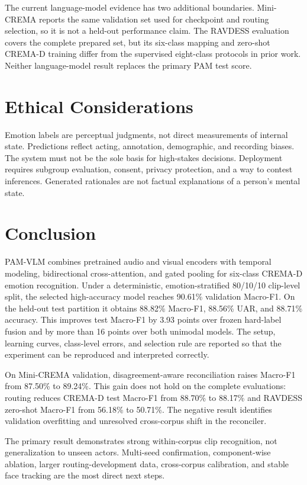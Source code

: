 \documentclass[conference]{IEEEtran}
\begin{document}
The current language-model evidence has two additional boundaries.
Mini-CREMA reports the same validation set used for checkpoint and routing
selection, so it is not a held-out performance claim. The RAVDESS evaluation
covers the complete prepared set, but its six-class mapping and zero-shot
CREMA-D training differ from the supervised eight-class protocols in prior
work. Neither language-model result replaces the primary PAM test score.

\section{Ethical Considerations}
\label{sec:ethics}

Emotion labels are perceptual judgments, not direct measurements of internal
state. Predictions reflect acting, annotation, demographic, and recording
biases. The system must not be the sole basis for high-stakes decisions.
Deployment requires subgroup evaluation, consent, privacy protection, and a
way to contest inferences. Generated rationales are not factual explanations
of a person's mental state.

\section{Conclusion}
\label{sec:conclusion}

PAM-VLM combines pretrained audio and visual encoders with temporal modeling,
bidirectional cross-attention, and gated pooling for six-class CREMA-D emotion
recognition. Under a deterministic, emotion-stratified 80/10/10 clip-level
split, the selected high-accuracy model reaches 90.61\% validation Macro-F1.
On the held-out test partition it obtains 88.82\% Macro-F1, 88.56\% UAR, and 88.71\%
accuracy. This improves test Macro-F1 by 3.93 points over frozen hard-label
fusion and by more than 16 points over both unimodal models. The setup,
learning curves, class-level errors, and selection rule are reported so that
the experiment can be reproduced and interpreted correctly.

On Mini-CREMA validation, disagreement-aware reconciliation raises Macro-F1
from 87.50\% to 89.24\%. This gain does not hold on the complete evaluations:
routing reduces CREMA-D test Macro-F1 from 88.70\% to 88.17\% and RAVDESS
zero-shot Macro-F1 from 56.18\% to 50.71\%. The negative result identifies
validation overfitting and unresolved cross-corpus shift in the reconciler.

The primary result demonstrates strong within-corpus clip recognition, not
generalization to unseen actors. Multi-seed confirmation, component-wise
ablation, larger routing-development data, cross-corpus calibration, and
stable face tracking are the most direct next steps.



\end{document}
